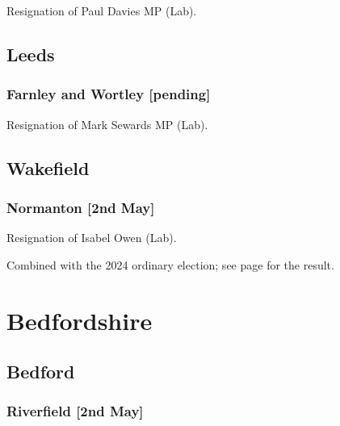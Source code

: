 \documentclass[a4paper,openany]{book}
\begin{document}
\begin{resultsiii}

Resignation of Paul Davies MP (Lab).

\subsection*{Leeds}

\subsubsection*{Farnley and Wortley \hspace*{\fill}\nolinebreak[1]%
	\enspace\hspace*{\fill}
	[pending]}


Resignation of Mark Sewards MP (Lab).

\subsection*{Wakefield}

\subsubsection*{Normanton \hspace*{\fill}\nolinebreak[1]%
	\enspace\hspace*{\fill}
	[2nd May]}


Resignation of Isabel Owen (Lab).

Combined with the 2024 ordinary election; see page \pageref{NormantonWakefield} for the result.

\section{Bedfordshire}

\subsection*{Bedford}

\subsubsection*{Riverfield \hspace*{\fill}\nolinebreak[1]%
	\enspace\hspace*{\fill}
	[2nd May]}


\end{resultsiii}
\end{document}
